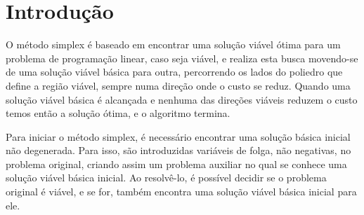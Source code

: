 \documentclass[
	12pt,				%
	openright,			%
	oneside,			%
	a4paper,			%
	english,			%
	french,				%
	spanish,			%
	brazil,				%
	]{abntex2}
\begin{document}
\chapter*[Introdução]{Introdução}

O método simplex é baseado em encontrar uma solução viável ótima para um problema de programação linear, caso seja viável, e realiza esta busca movendo-se de uma solução viável básica para outra, percorrendo os lados do poliedro que define a região viável, sempre numa direção onde o custo se reduz. Quando uma solução viável básica é alcançada e nenhuma das direções viáveis reduzem o custo temos então a solução ótima, e o algoritmo termina. 

Para iniciar o método simplex, é necessário encontrar uma solução básica inicial não degenerada. Para isso, são introduzidas variáveis de folga, não negativas, no problema original, criando assim um problema auxiliar no qual se conhece uma solução viável básica inicial. Ao resolvê-lo, é possível decidir se o problema original é viável, e se for, também encontra uma solução viável básica inicial para ele. 
\end{document}
